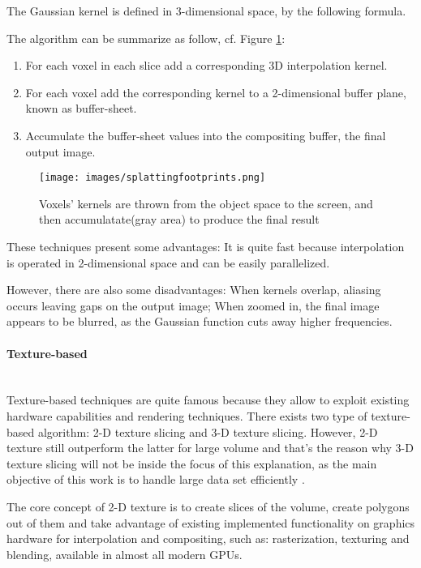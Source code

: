 \documentclass[12pt,a4paper]{extarticle}
\newcommand{\linespace}{\vspace{0pt}}
\newcommand{\myparagraph}[1]{\paragraph{#1}\mbox{}\\}
\begin{document}
The Gaussian kernel is defined in 3-dimensional space, by the following formula.
\linespace
\begin{center}
\end{center}
\linespace
The algorithm can be summarize as follow, cf. Figure \ref{fig:splattingfootprints}:
\begin{enumerate}
\item For each voxel in each slice add a corresponding 3D interpolation kernel.
\item For each voxel add the corresponding kernel to a 2-dimensional buffer plane, known as buffer-sheet.
\item Accumulate the buffer-sheet values into the compositing buffer, the final output image. 
\end{enumerate}

\begin{figure}[hbtp]
\centering
\texttt{[image: images/splattingfootprints.png]}
\caption{Voxels' kernels are thrown from the object space to the screen, and then accumulatate(gray area) to produce the final result}
\label{fig:splattingfootprints}
\end{figure}


These techniques present some advantages: It is quite fast because interpolation is operated in 2-dimensional space and can be easily parallelized.


However, there are also some disadvantages: When kernels overlap, aliasing occurs leaving gaps on the output image; When zoomed in, the final image appears to be blurred, as the Gaussian function cuts away higher frequencies.

\myparagraph{Texture-based} Texture-based techniques are quite famous because they allow to exploit existing hardware capabilities and rendering techniques. There exists two type of texture-based algorithm: 2-D texture slicing and 3-D texture slicing. However, 2-D texture still outperform the latter for large volume and that's the reason why 3-D texture slicing will not be inside the focus of this explanation, as the main objective of this work is to handle large data set efficiently \cite{PFISTER2005229}.


The core concept of 2-D texture is to create slices of the volume, create polygons out of them and take advantage of existing implemented functionality on graphics hardware for interpolation and compositing, such as: rasterization, texturing and blending, available in almost all modern GPUs.
\linespace
\end{document}
